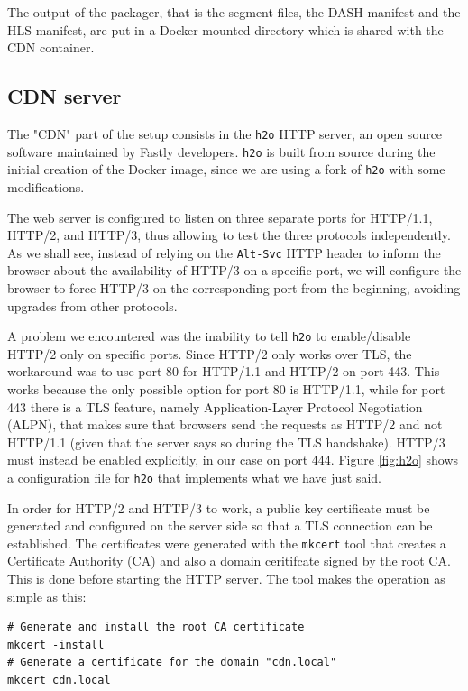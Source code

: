 The output of the packager, that is the segment files, the DASH manifest and the HLS manifest, are put in a Docker mounted directory which is shared with the CDN container.

\subsection{CDN server}
\label{sec:eval/testbed/cdn}

The "CDN" part of the setup consists in the \texttt{h2o} HTTP server, an open source software maintained by Fastly developers. \texttt{h2o} is built from source during the initial creation of the Docker image, since we are using a fork of \texttt{h2o} with some modifications.

The web server is configured to listen on three separate ports for HTTP/1.1, HTTP/2, and HTTP/3, thus allowing to test the three protocols independently. As we shall see, instead of relying on the \texttt{Alt-Svc} HTTP header to inform the browser about the availability of HTTP/3 on a specific port, we will configure the browser to force HTTP/3 on the corresponding port from the beginning, avoiding upgrades from other protocols.

A problem we encountered was the inability to tell \texttt{h2o} to enable/disable HTTP/2 only on specific ports. Since HTTP/2 only works over TLS, the workaround was to use port 80 for HTTP/1.1 and HTTP/2 on port 443. This works because the only possible option for port 80 is HTTP/1.1, while for port 443 there is a TLS feature, namely Application-Layer Protocol Negotiation (ALPN), that makes sure that browsers send the requests as HTTP/2 and not HTTP/1.1 (given that the server says so during the TLS handshake). HTTP/3 must instead be enabled explicitly, in our case on port 444. Figure \ref{fig:h2o} shows a configuration file for \texttt{h2o} that implements what we have just said.

In order for HTTP/2 and HTTP/3 to work, a public key certificate must be generated and configured on the server side so that a TLS connection can be established. The certificates were generated with the \texttt{mkcert} tool that creates a Certificate Authority (CA) and also a domain ceritifcate signed by the root CA. This is done before starting the HTTP server. The tool makes the operation as simple as this:

\begin{verbatim}
# Generate and install the root CA certificate
mkcert -install
# Generate a certificate for the domain "cdn.local"
mkcert cdn.local
\end{verbatim}

